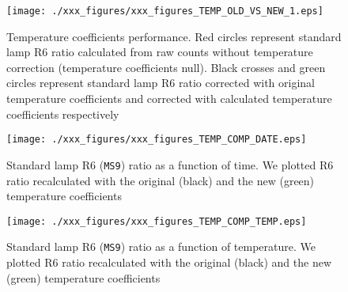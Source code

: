 
\begin{figure}[htbp!]
\begin{center}   
     \texttt{[image: ./xxx\_figures/xxx\_figures\_TEMP\_OLD\_VS\_NEW\_1.eps]}
     \caption{Temperature coefficients performance. Red circles represent standard lamp R6 ratio calculated from raw counts without temperature correction (temperature coefficients null). Black crosses and green circles represent standard lamp R6 ratio corrected with original temperature coefficients and corrected with calculated temperature coefficients respectively}
	   \label{fig:TEMP_OLD_VS_NEW_1}
\end{center}
\end{figure}


\begin{figure}[htbp!]
\begin{center}   
     \texttt{[image: ./xxx\_figures/xxx\_figures\_TEMP\_COMP\_DATE.eps]}
     \caption{ Standard lamp R6 (\texttt{MS9}) ratio as a function of time. We plotted R6 ratio recalculated with the original (black) and the new (green) temperature coefficients}
	   \label{fig:TEMP_comp_DATE}
\end{center}
\end{figure}

\begin{figure}[htbp!]
\begin{center}   
     \texttt{[image: ./xxx\_figures/xxx\_figures\_TEMP\_COMP\_TEMP.eps]}
     \caption{ Standard lamp R6 (\texttt{MS9}) ratio as a function of temperature. We plotted R6 ratio recalculated with the original (black) and the new (green) temperature coefficients}
	   \label{fig:TEMP_COMP_TEMP}
\end{center}
\end{figure}


